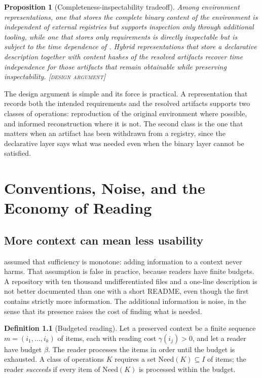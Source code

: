 \documentclass[11pt,twoside,openright]{book}
\theoremstyle{plain}
\newtheorem{proposition}[theorem]{Proposition}
\theoremstyle{definition}
\newtheorem{definition}[theorem]{Definition}
\theoremstyle{remark}
\newcommand{\Design}{\textup{\textsc{[design argument]}}}
\begin{document}
\begin{proposition}[Completeness-inspectability tradeoff]\label{prop:envtradeoff}
Among environment representations, one that stores the complete binary content of the environment is independent of external registries but supports inspection only through additional tooling, while one that stores only requirements is directly inspectable but is subject to the time dependence of . Hybrid representations that store a declarative description together with content hashes of the resolved artifacts recover time independence for those artifacts that remain obtainable while preserving inspectability.
\Design{}
\end{proposition}

The design argument is simple and its force is practical. A representation that records both the intended requirements and the resolved artifacts supports two classes of operations: reproduction of the original environment where possible, and informed reconstruction where it is not. The second class is the one that matters when an artifact has been withdrawn from a registry, since the declarative layer says what was needed even when the binary layer cannot be satisfied.

\chapter{Conventions, Noise, and the Economy of Reading}\label{ch:conventions}

\section{More context can mean less usability}

 assumed that sufficiency is monotone: adding information to a context never harms. That assumption is false in practice, because readers have finite budgets. A repository with ten thousand undifferentiated files and a one-line description is not better documented than one with a short README, even though the first contains strictly more information. The additional information is noise, in the sense that its presence raises the cost of finding what is needed.

\begin{definition}[Budgeted reading]\label{def:budgetreading}
Let a preserved context be a finite sequence $m=(i_1,\dots,i_k)$ of items, each with reading cost $\gamma(i_j)>0$, and let a reader have budget $\beta$. The reader processes the items in order until the budget is exhausted. A class of operations $K$ requires a set $\mathrm{Need}(K)\subseteq I$ of items; the reader \emph{succeeds} if every item of $\mathrm{Need}(K)$ is processed within the budget.
\end{definition}
\end{document}
